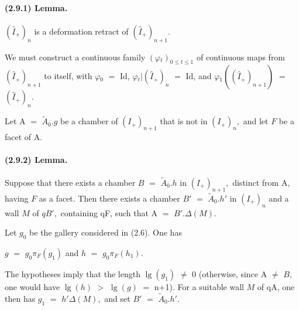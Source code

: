 \documentclass[10pt,a4paper]{article}
\begin{document}
\paragraph{(2.9.1) Lemma.} \ensuremath{(\widehat{I}_+)_n} is a deformation retract of \ensuremath{(\widehat{I}_+)_{n+1}.}


We must construct a continuous family \ensuremath{(\varphi{}_t)_{0\le{}t\le{}1}} of continuous maps from \ensuremath{(\widehat{I}_+)_{n+1}} to itself, with \ensuremath{\varphi{}_0} \ensuremath{=} Id, \ensuremath{\varphi{}_t|(\widehat{I}_+)_n} \ensuremath{=} Id, and \ensuremath{\varphi{}_1((\widehat{I}_+)_{n+1})} \ensuremath{=} \ensuremath{(\widehat{I}_+)_n.}\par

Let A \ensuremath{=} \ensuremath{\widetilde{A}_0.g} be a chamber of \ensuremath{(I_+)_{n+1}} that is not in \ensuremath{(I_+)_n,} and let \ensuremath{F} be a facet of A.\par

\paragraph{(2.9.2) Lemma.} Suppose that there exists a chamber \ensuremath{B} \ensuremath{=} \ensuremath{\widetilde{A}_0.h} in \ensuremath{(I_+)_{n+1},} distinct from A, having \ensuremath{F} as a facet. Then there exists a chamber \ensuremath{B'} \ensuremath{=} \ensuremath{\widetilde{A}_0.h'} in \ensuremath{(I_+)_n} and a wall \ensuremath{M} of \ensuremath{qB',} containing qF, such that A \ensuremath{=} \ensuremath{B'.\Delta{}(M).}

Let \ensuremath{g_0} be the gallery considered in (2.6). One has\par

\ensuremath{g} \ensuremath{=} \ensuremath{g_0\pi{}_F(g_1)} and \ensuremath{h} \ensuremath{=} \ensuremath{g_0\pi{}_F(h_1).}\par

The hypotheses imply that the length \ensuremath{\operatorname{lg}(g_1)} \ensuremath{\ne{}} 0 (otherwise, since A \ensuremath{\ne{}} \ensuremath{B,} one would have \ensuremath{\operatorname{lg}(h)} \ensuremath{>} \ensuremath{\operatorname{lg}(g)} \ensuremath{=} n+1). For a suitable wall \ensuremath{M} of qA, one then has \ensuremath{g_1} \ensuremath{=} \ensuremath{h'\Delta{}(M),} and set \ensuremath{B'} \ensuremath{=} \ensuremath{\widetilde{A}_0.h'.}\par
\end{document}
